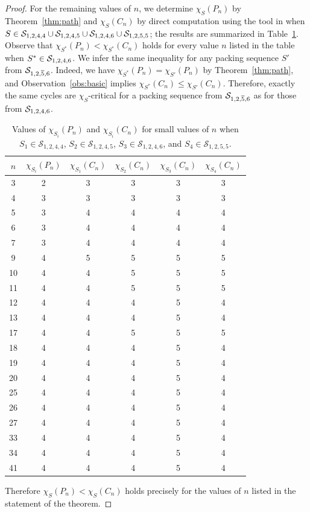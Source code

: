 \documentclass[12pt]{article}
\newcommand{\cS}{{\cal S}}
\begin{document}
\begin{proof}
For the remaining values of $n$, we determine $\chi_S(P_n)$ by Theorem~\ref{thm:path} and 
$\chi_S(C_n)$ by direct computation using the tool in \cite{Spackingtool} when $S \in \cS_{1,2,4,4} \cup \cS_{1,2,4,5} \cup \cS_{1,2,4,6} \cup \cS_{1,2,5,5}$; the results are summarized in 
Table~\ref{tab:smallcases}. Observe that $\chi_{S^*}(P_n) < \chi_{S^*}(C_n)$ holds for every value $n$ listed in the table when $S^* \in \cS_{1,2,4,6}$. We infer the same inequality for any packing sequence $S'$ from $\cS_{1,2,\overline{5},6}$. Indeed, we have $\chi_{S^*}(P_n) =\chi_{S'}(P_n)$ by Theorem~\ref{thm:path}, and Observation~\ref{obs:basic} implies $\chi_{S^*}(C_n) \leq \chi_{S'}(C_n)$. Therefore, exactly the same cycles are $\chi_S$-critical for a packing sequence from $\cS_{1,2,\overline{5},6}$ as for those from $\cS_{1,2,4,6}$.
\begin{table}[!ht]
\centering
\begin{tabular}{|c||c||c|c|c|c|}
\hline
$n$ & $\chi_{S_i}(P_n)$ 
& $\chi_{S_1}(C_n)$ 
& $\chi_{S_2}(C_n)$ 
& $\chi_{S_3}(C_n)$ 
& $\chi_{S_4}(C_n)$ \\
\hline
3  & 2 & 3 & 3 & 3 & 3 \\ \hline
4  & 3 & 3 & 3 & 3 & 3 \\ \hline
5  & 3 & 4 & 4 & 4 & 4 \\ \hline
6  & 3 & 4 & 4 & 4 & 4 \\ \hline
7  & 3 & 4 & 4 & 4 & 4 \\ \hline
9  & 4 & 5 & 5 & 5 & 5 \\ \hline
10 & 4 & 4 & 5 & 5 & 5 \\ \hline
11 & 4 & 4 & 5 & 5 & 5 \\ \hline
12 & 4 & 4 & 4 & 5 & 4 \\ \hline
13 & 4 & 4 & 4 & 5 & 4 \\ \hline
17 & 4 & 4 & 5 & 5 & 5 \\ \hline
18 & 4 & 4 & 4 & 5 & 4 \\ \hline
19 & 4 & 4 & 4 & 5 & 4 \\ \hline
20 & 4 & 4 & 4 & 5 & 4 \\ \hline
25 & 4 & 4 & 4 & 5 & 4 \\ \hline
26 & 4 & 4 & 4 & 5 & 4 \\ \hline
27 & 4 & 4 & 4 & 5 & 4 \\ \hline
33 & 4 & 4 & 4 & 5 & 4 \\ \hline
34 & 4 & 4 & 4 & 5 & 4 \\ \hline
41 & 4 & 4 & 4 & 5 & 4 \\
\hline
\end{tabular}
\caption{Values of $\chi_{S_i}(P_n)$ and $\chi_{S_i}(C_n)$ for small values of $n$ when $S_1 \in \mathcal{S}_{1,2,4,4}$, $S_2 \in \mathcal{S}_{1,2,4,5}$, $S_3 \in \mathcal{S}_{1,2,4,6}$, and  $S_4 \in \mathcal{S}_{1,2,5,5}$.}\label{tab:smallcases}
\end{table}

Therefore $\chi_S(P_n)<\chi_S(C_n)$ holds
precisely for the values of $n$ listed in the statement of the theorem. 
\end{proof}
\end{document}
